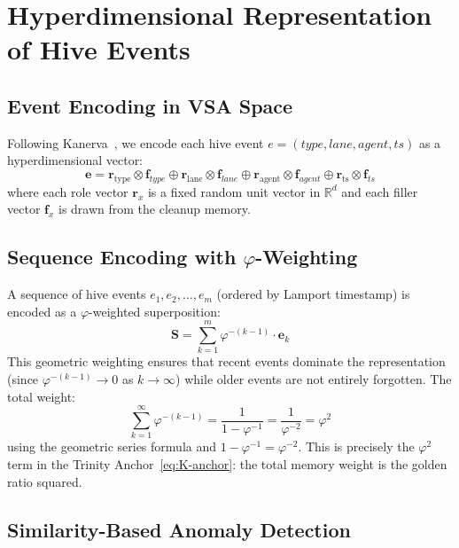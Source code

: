 
\section{Hyperdimensional Representation of Hive Events}
\label{sec:K-hdc}

\subsection{Event Encoding in VSA Space}
\label{ssec:K-event-encoding}

Following Kanerva~\cite{kanerva_hyperdimensional}, we encode each
hive event $e = (\textit{type}, \textit{lane}, \textit{agent},
\textit{ts})$ as a hyperdimensional vector:
\[
  \mathbf{e} = \mathbf{r}_{\text{type}} \otimes \mathbf{f}_{\textit{type}}
             \oplus \mathbf{r}_{\text{lane}} \otimes \mathbf{f}_{\textit{lane}}
             \oplus \mathbf{r}_{\text{agent}} \otimes \mathbf{f}_{\textit{agent}}
             \oplus \mathbf{r}_{\text{ts}} \otimes \mathbf{f}_{\textit{ts}}
\]
where each role vector $\mathbf{r}_x$ is a fixed random unit vector
in $\mathbb{R}^{d}$ and each filler vector $\mathbf{f}_x$ is drawn
from the cleanup memory.

\subsection{Sequence Encoding with $\varphi$-Weighting}
\label{ssec:K-seq-encoding}

A sequence of hive events $e_1, e_2, \ldots, e_m$ (ordered by Lamport
timestamp) is encoded as a $\varphi$-weighted superposition:
\[
  \mathbf{S} = \sum_{k=1}^{m} \varphi^{-(k-1)} \cdot \mathbf{e}_k
\]
This geometric weighting ensures that recent events dominate the
representation (since $\varphi^{-(k-1)} \to 0$ as $k \to \infty$)
while older events are not entirely forgotten. The total weight:
\[
  \sum_{k=1}^{\infty} \varphi^{-(k-1)} = \frac{1}{1 - \varphi^{-1}}
  = \frac{1}{\varphi^{-2}} = \varphi^{2}
\]
using the geometric series formula and $1 - \varphi^{-1} = \varphi^{-2}$.
This is precisely the $\varphi^{2}$ term in the Trinity
Anchor~\eqref{eq:K-anchor}: the total memory weight is the golden ratio
squared.

\subsection{Similarity-Based Anomaly Detection}
\label{ssec:K-anomaly}

